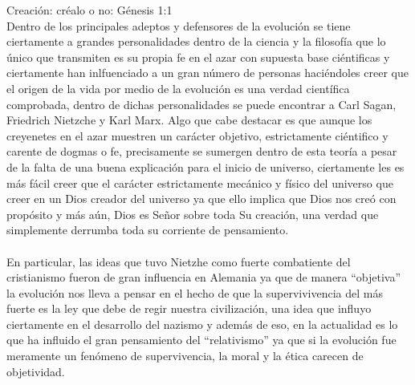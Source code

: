 \begin{section}{Creación: créalo o no: Génesis 1:1}
\\
Dentro de los principales adeptos y defensores de la evolución se tiene ciertamente a grandes personalidades dentro de la ciencia y la filosofía que lo único que transmiten es su propia fe en el azar con supuesta base ciéntificas y ciertamente han inlfuenciado a un gran número de personas haciéndoles creer que el origen de la vida por medio de la evolución es una verdad científica comprobada, dentro de dichas personalidades se puede encontrar a Carl Sagan, Friedrich Nietzche y Karl Marx. Algo que cabe destacar es que aunque los creyenetes en el azar muestren un carácter objetivo, estrictamente ciéntifico y carente de dogmas o fe, precisamente se sumergen dentro de esta teoría a pesar de la falta de una buena explicación para el inicio de universo, ciertamente les es más fácil creer que el carácter estrictamente mecánico y físico del universo que creer en un Dios creador del universo ya que ello implica que Dios nos creó con propósito y más aún, Dios es Señor sobre toda Su creación, una verdad que simplemente derrumba toda su corriente de pensamiento.\\
\\
En particular, las ideas que tuvo Nietzhe como fuerte combatiente del cristianismo fueron de gran influencia en Alemania ya que de manera ``objetiva'' la evolución nos lleva a pensar en el hecho de que la supervivivencia del más fuerte es la ley que debe de regir nuestra civilización, una idea que influyo ciertamente en el desarrollo del nazismo y además de eso, en la actualidad es lo que ha influido el gran pensamiento del ``relativismo'' ya que si la evolución fue meramente un fenómeno de supervivencia, la moral y la ética carecen de objetividad.

\end{section}
\newpage
